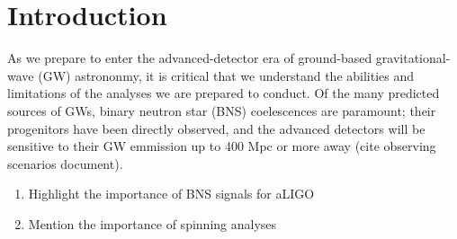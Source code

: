 \section{Introduction}

As we prepare to enter the advanced-detector era of ground-based gravitational-wave (GW) astrononmy, it is critical that we understand the abilities and limitations of the analyses we are prepared to conduct.  Of the many predicted sources of GWs, binary neutron star (BNS) coelescences are paramount; their progenitors have been directly observed, and the advanced detectors will be sensitive to their GW emmission up to 400 Mpc or more away (cite observing scenarios document).


\begin{enumerate}
\item Highlight the importance of BNS signals for aLIGO
\item Mention the importance of spinning analyses
\end{enumerate}